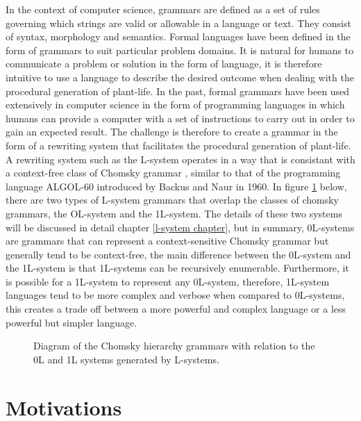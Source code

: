 In the context of computer science, grammars are defined as a set of rules governing which strings are valid or allowable in a language or text. They consist of syntax, morphology and semantics. Formal languages have been defined in the form of grammars to suit particular problem domains. It is natural for humans to communicate a problem or solution in the form of language, it is therefore intuitive to use a language to describe the desired outcome when dealing with the procedural generation of plant-life. In the past, formal grammars have been used extensively in computer science in the form of programming languages in which humans can provide a computer with a set of instructions to carry out in order to gain an expected result. The challenge is therefore to create a  grammar in the form of a rewriting system that facilitates the procedural generation of plant-life. A rewriting system such as the L-system operates in a way that is consistant with a context-free class of Chomsky grammar \cite{chomsky1956three}, similar to that of the programming language ALGOL-60 introduced by Backus and Naur in  1960\cite{backus1960report}. In figure \ref{chomsky grammars} below, there are two types of L-system grammars that overlap the classes of chomsky grammars, the OL-system and the 1L-system. The details of these two systems will be discussed in detail chapter \ref{l-system chapter}, but in summary, 0L-systems are grammars that can represent a context-sensitive Chomsky grammar but generally tend to be context-free, the main difference between the 0L-system and the 1L-system is that 1L-systems can be recursively enumerable. Furthermore, it is possible for a 1L-system to represent any 0L-system, therefore, 1L-system languages tend to be more complex and verbose when compared to 0L-systems, this creates a trade off between a more powerful and complex language or a less powerful but simpler language. 

\begin{figure}[htbp]
	{\centering
		\setlength{\fboxrule}{1pt}
		\vspace{7px}
		\caption{Diagram of the Chomsky hierarchy grammars with relation to the 0L and 1L systems generated by L-systems.} \label{chomsky grammars}
	}
\end{figure}
\FloatBarrier

\section{Motivations}
 

